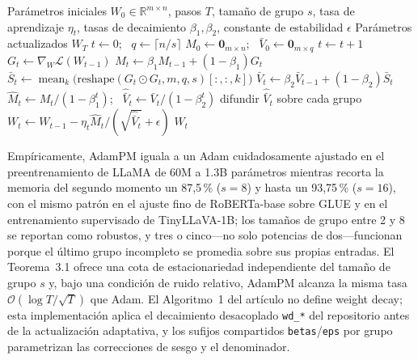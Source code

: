 \begin{algorithm}[H]
\caption{AdamPM (Adam con momentos agrupados)}
\label{alg:adampm}
\begin{algorithmic}[1]
\Require Parámetros iniciales $W_0 \in \mathbb{R}^{m\times n}$, pasos $T$, tamaño de grupo $s$, tasa de aprendizaje $\eta_t$, tasas de decaimiento $\beta_1, \beta_2$, constante de estabilidad $\epsilon$
\Ensure Parámetros actualizados $W_T$
\State $t \gets 0$; \ $q \gets \lceil n/s \rceil$ 
\State $M_0 \gets \mathbf{0}_{m\times n}$; \ $\bar{V}_0 \gets \mathbf{0}_{m\times q}$ 
\Repeat
    \State $t \gets t + 1$
    \State $G_t \gets \nabla_W \mathcal{L}(W_{t-1})$ 
    \State $M_t \gets \beta_1 M_{t-1} + (1-\beta_1) G_t$ 
    \State $\bar{S}_t \gets \operatorname{mean}_{k}\big(\mathrm{reshape}(G_t \odot G_t, m, q, s)[:,:,k]\big)$ 
    \State $\bar{V}_t \gets \beta_2 \bar{V}_{t-1} + (1-\beta_2) \bar{S}_t$ 
    \State $\hat{M}_t \gets M_t/(1-\beta_1^t)$; \ $\hat{\bar{V}}_t \gets \bar{V}_t/(1-\beta_2^t)$ 
    \State difundir $\hat{\bar{V}}_t$ sobre cada grupo 
    \State $W_t \gets W_{t-1} - \eta_t \hat{M}_t / (\sqrt{\hat{\bar{V}}_t} + \epsilon)$ 
\Return $W_t$
\end{algorithmic}
\end{algorithm}

Empíricamente, AdamPM iguala a un Adam cuidadosamente ajustado en el
preentrenamiento de LLaMA de 60M a 1.3B parámetros mientras recorta la memoria
del segundo momento un 87,5\,\% ($s{=}8$) y hasta un 93,75\,\% ($s{=}16$), con
el mismo patrón en el ajuste fino de RoBERTa-base sobre GLUE y en el
entrenamiento supervisado de TinyLLaVA-1B; los tamaños de grupo entre 2 y 8 se
reportan como robustos, y tres o cinco---no solo potencias de dos---funcionan
porque el último grupo incompleto se promedia sobre sus propias entradas. El
Teorema~3.1 ofrece una cota de estacionariedad independiente del tamaño de
grupo $s$ y, bajo una condición de ruido relativo, AdamPM alcanza la misma tasa
$\mathcal{O}(\log T/\sqrt{T})$ que Adam. El Algoritmo~1 del artículo no define
weight decay; esta implementación aplica el decaimiento desacoplado
\texttt{wd\_*} del repositorio antes de la actualización adaptativa, y los
sufijos compartidos \texttt{betas}/\texttt{eps} por grupo parametrizan las
correcciones de sesgo y el denominador.

